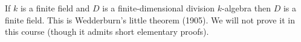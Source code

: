 If $k$ is a finite field and $D$ is a finite-dimensional division $k$-algebra
then $D$ is a finite field. This is Wedderburn's little theorem (1905). We will
not prove it in this course (though it admits short elementary proofs).
